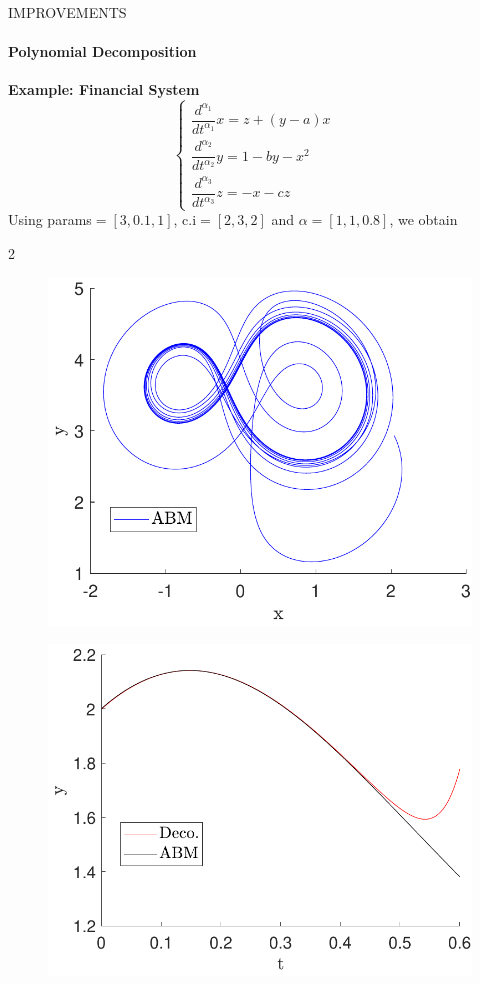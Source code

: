 \begin{frame}{IMPROVEMENTS}
\framesubtitle{Polynomial Decomposition}
\textbf{Example: Financial System}
\begin{equation}
    \begin{cases}
    \dfrac{d^{\alpha_1}}{dt^{\alpha_1}} x=z+(y-a)x&\\[6pt]
    \dfrac{d^{\alpha_2}}{dt^{\alpha_2}} y=1-by-x^2&\\[6pt]
    \dfrac{d^{\alpha_3}}{dt^{\alpha_3}} z=-x-cz&
    \end{cases}
\end{equation}
Using params$=[3,0.1,1]$, c.i$=[2,3,2]$ and $\alpha=[1,1,0.8]$, we obtain\begin{multicols}
{2}
\begin{figure}[H]
    \centering
    \includegraphics[scale=0.35]{files/comparFrac/finance_chaotic.pdf}
    
\end{figure}
\columnbreak
\begin{figure}[H]
    \centering
    \includegraphics[scale=0.35]{files/mejoras/ABM-vs-Deco-finance.pdf}
\end{figure}
\end{multicols}
\end{frame}

